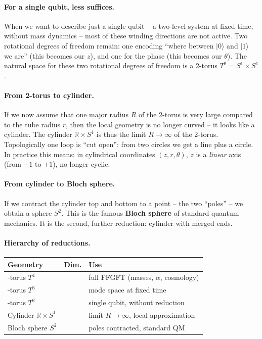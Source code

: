 \paragraph{For a single qubit, less suffices.}
When we want to describe just a single qubit -- a two-level system
at fixed time, without mass dynamics -- most of these winding
directions are not active. Two rotational degrees of freedom remain:
one encoding \enquote{where between $|0\rangle$ and $|1\rangle$ we
are} (this becomes our $z$), and one for the phase (this becomes
our $\theta$). The natural space for these two rotational degrees
of freedom is a 2-torus $T^2 = S^1 \times S^1$.

\paragraph{From 2-torus to cylinder.}
If we now assume that one major radius $R$ of the 2-torus is very
large compared to the tube radius $r$, then the local geometry is
no longer curved -- it looks like a cylinder. The cylinder
$\mathbb{R} \times S^1$ is thus the limit $R \to \infty$ of the
2-torus. Topologically one loop is \enquote{cut open}: from two
circles we get a line plus a circle. In practice this means: in
cylindrical coordinates $(z, r, \theta)$, $z$ is a \emph{linear}
axis (from $-1$ to $+1$), no longer cyclic.

\paragraph{From cylinder to Bloch sphere.}
If we contract the cylinder top and bottom to a point -- the two
\enquote{poles} -- we obtain a sphere $S^2$. This is the famous
\textbf{Bloch sphere} of standard quantum mechanics. It is the
second, further reduction: cylinder with merged ends.

\paragraph{Hierarchy of reductions.}
\begin{center}
\renewcommand{\arraystretch}{1.4}
{\small
\begin{tabular}{>{\raggedright\arraybackslash}p{3.0cm}>{\raggedright\arraybackslash}p{1.4cm}>{\raggedright\arraybackslash}p{4.0cm}}
\toprule
\textbf{Geometry} & \textbf{Dim.} & \textbf{Use} \\
\midrule
4-torus $T^4$ & 4 & full FFGFT (masses, $\alpha$, cosmology) \\
3-torus $T^3$ & 3 & mode space at fixed time \\
2-torus $T^2$ & 2 & single qubit, without reduction \\
Cylinder $\mathbb{R} \times S^1$ & 2 & limit $R \to \infty$, local approximation \\
Bloch sphere $S^2$ & 2 & poles contracted, standard QM \\
\bottomrule
\end{tabular}
}
\renewcommand{\arraystretch}{1.0}
\end{center}

